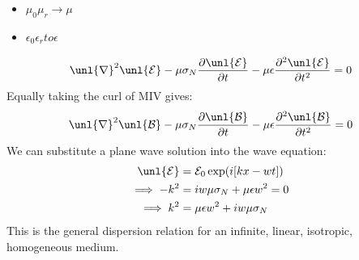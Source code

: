 \documentclass[a4paper, 11pt, normalem]{report}
\newcommand\p{\partial}
\newcommand\E{\mathcal{E}}
\newcommand\uE{\unl{\E}}
\newcommand\B{\mathcal{B}}
\newcommand\uB{\unl{\B}}
\newcommand\del{\unl{\nabla}}
\newcommand\eno{\epsilon_0}
\newcommand\er{\epsilon_r}
\newcommand\e{\epsilon}
\begin{document}
\chapter{}

\begin{itemize}
    \item $\mu_0\mu_r \to \mu$
    \item $\eno\er to \e$
\end{itemize}
\begin{equation}
    \del^2\uE - \mu\sigma_N\frac{\p \uE}{\p t} - \mu\e\frac{\p^2\uE}{\p t^2} = 0
\end{equation}
Equally taking the curl of M\RN{4} gives:
\begin{equation}
    \del^2\uB - \mu\sigma_N \frac{\p \uB}{\p t} - \mu\e\frac{\p^2\uB}{\p t^2} = 0
\end{equation}
We can substitute a plane wave solution into the wave equation:
\begin{align}
    \uE &= \E_0 \exp(i[kx - wt]) \\
    \implies -k^2 &= iw\mu\sigma_N + \mu\e w^2 = 0 \\
    \implies k^2 &= \mu\e w^2 + iw\mu\sigma_N
\end{align}
This is the general dispersion relation for an infinite, linear, isotropic, homogeneous medium.
\end{document}
